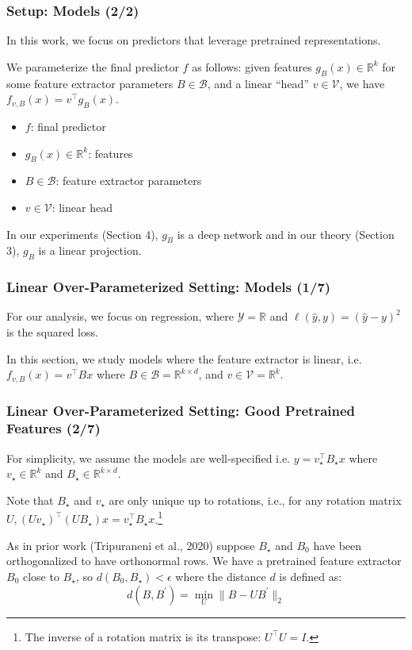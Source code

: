 \documentclass[16pt,aspectratio=169]{beamer}
\begin{document}
\begin{frame}
    \frametitle{Setup: Models (2/2)}

    In this work, we focus on predictors that leverage pretrained representations. 

    We parameterize the final predictor $f$ as follows: given features $g_B(x) \in \mathbb{R}^k$ for some feature extractor parameters $B \in \mathcal{B}$, and a linear ``head'' $v \in \mathcal{V}$, we have $f_{v, B}(x)=v^{\top} g_B(x)$. 
    \begin{itemize}
        \item $f$: final predictor
        \item $g_B(x) \in \mathbb{R}^k$: features
        \item $B \in \mathcal{B}$: feature extractor parameters
        \item $v \in \mathcal{V}$: linear head
    \end{itemize}

    In our experiments (Section 4), $g_B$ is a deep network and in our theory (Section 3), $g_B$ is a linear projection.

\end{frame}

\begin{frame}
    \frametitle{Linear Over-Parameterized Setting: Models (1/7)}
    
    For our analysis, we focus on regression, where $\mathcal{Y}=\mathbb{R}$ and $\ell(\hat{y}, y) = (\hat{y}-y)^2$ is the squared loss.

    In this section, we study models where the feature extractor is linear, i.e. $f_{v,B}(x) = v^\top Bx$ where $B \in \mathcal{B}=\mathbb{R}^{k \times d}$, and $v \in \mathcal{V} = \mathbb{R}^k$.
\end{frame}

\begin{frame}
    \frametitle{Linear Over-Parameterized Setting: Good Pretrained Features (2/7)}

    For simplicity, we assume the models are well-specified i.e. $y=v_{\star}^{\top} B_{\star} x$ where $v_{\star} \in \mathbb{R}^k$ and $B_{\star} \in \mathbb{R}^{k \times d}$.

    Note that $B_{\star}$ and $v_{\star}$ are only unique up to rotations, i.e., for any rotation matrix $U,\left(U v_{\star}\right)^\top \left(U B_{\star}\right) x=v_{\star}^\top  B_{\star} x$.\footnote{The inverse of a rotation matrix is its transpose: $U^\top U = I$.}

    As in prior work (Tripuraneni et al., 2020) suppose $B_{\star}$ and $B_0$ have been orthogonalized to have orthonormal rows. We have a pretrained feature extractor $B_0$ close to $B_{\star}$, so $d(B_0, B_{\star}) < \epsilon$ where the distance $d$ is defined as:
    \begin{equation}
        d(B, B^\prime) = \min_{U} \| B-UB^\prime \|_2
    \end{equation}

\end{frame}
\end{document}
